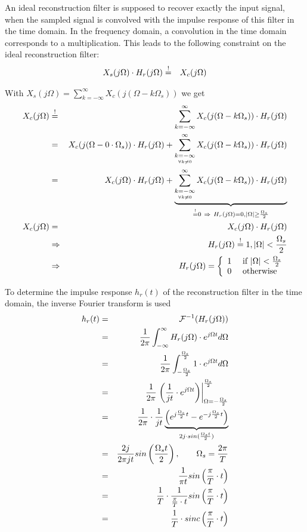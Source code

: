 An ideal reconstruction filter is supposed to recover exactly the input signal, when the sampled signal is convolved with the impulse response of this filter in the time domain. In the frequency domain, a convolution in the time domain corresponds to a multiplication. This leads to the following constraint on the ideal reconstruction filter:
\begin{eqnarray*}
X_s(j\Omega) \cdot H_r(j\Omega) & \overset{!}{=} & X_c(j\Omega)
\end{eqnarray*}

With $X_s(j\Omega) = \sum_{k=-\infty}^{\infty} X_c(j(\Omega-k\Omega_s) )$ we get
\begin{eqnarray*}
X_c(j\Omega) & \overset{!}{=} &  \sum_{k=-\infty}^{\infty} X_c(j(\Omega-k\Omega_s) ) \* H_r(j\Omega) \\
& = & X_c(j(\Omega-0\*\Omega_s) ) \* H_r(j\Omega) +  \sum_{\underset{\forall k \neq 0}{k=-\infty}}^{\infty} X_c(j(\Omega-k\Omega_s) ) \* H_r(j\Omega) \\
& = & X_c(j\Omega ) \* H_r(j\Omega) +  \underbrace{\sum_{\underset{\forall k \neq 0}{k=-\infty}}^{\infty} X_c(j(\Omega-k\Omega_s) ) \* H_r(j\Omega)}_{\overset{!}{=} 0 \ \Rightarrow \ H_r(j\Omega) = 0, |\Omega| \geq \frac{\Omega_s}{2}} \\
X_c(j\Omega) & = & X_c(j\Omega ) \* H_r(j\Omega) \\
& \Rightarrow & H_r(j\Omega) \overset{!}{=} 1, |\Omega| < \frac{\Omega_s}{2} \\
& \Rightarrow & H_r(j\Omega) = \left\{ \begin{array}{rl}
1 &\mbox{ if $|\Omega| < \frac{\Omega_s}{2}$} \\
0 &\mbox{ otherwise}
\end{array} \right.
\end{eqnarray*}

To determine the impulse response $h_r(t)$ of the reconstruction filter in the time domain, the inverse Fourier transform is used
\begin{eqnarray*}
h_r(t) & = & \mathcal{F}^{-1}(H_r(j\Omega))\\
& = & \frac{1}{2\pi} \int_{-\infty}^{\infty} H_r(j\Omega) \cdot e^{j \Omega t} d\Omega \\
& = & \frac{1}{2\pi} \int_{-\frac{\Omega_s}{2}}^{\frac{\Omega_s}{2}} 1 \cdot e^{j \Omega t} d\Omega \\
& = & \frac{1}{2\pi} \left. \left( \frac{1}{jt}  \cdot e^{j \Omega t} \right) \right|_{\Omega= -\frac{\Omega_s}{2}}^{\frac{\Omega_s}{2}} \\
& = & \frac{1}{2\pi} \cdot \frac{1}{jt} \underbrace{\left( e^{j \frac{\Omega_s}{2} t} - e^{-j \frac{\Omega_s}{2} t} \right)}_{2j\cdot sin(\frac{\Omega_s t}{2})} \\
& = & \frac{2j}{2\pi jt} sin\left(\frac{\Omega_s t}{2}\right), \qquad \Omega_s = \frac{2\pi}{T}\\
& = & \frac{1}{\pi t} sin\left(\frac{\pi}{T}\cdot t\right) \\
& = & \frac{1}{T} \cdot \frac{1}{\frac{\pi}{T} \cdot t} sin\left(\frac{\pi}{T}\cdot t\right) \\
& = & \frac{1}{T} \cdot sinc\left(\frac{\pi}{T}\cdot t\right)
\end{eqnarray*}

